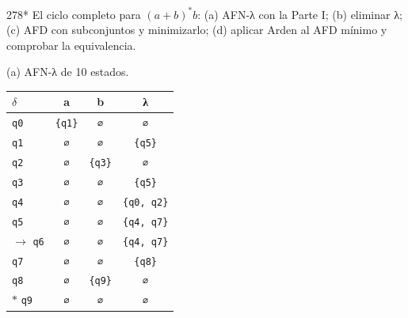 \documentclass[11pt]{article}
\begin{document}
\begin{ejercicio}{278}{*}
El ciclo completo para $(a + b)^*b$: (a) AFN-λ con la Parte I; (b) eliminar λ; (c) AFD con subconjuntos y minimizarlo; (d) aplicar Arden al AFD mínimo y comprobar la equivalencia.
\end{ejercicio}
\proc (a) AFN-λ de 10 estados.\begin{center}\small\begin{tabular}{lccc}\toprule
$\delta$ & a & b & λ \\\midrule
 \texttt{q0} & \texttt{\{q1\}} & \texttt{∅} & \texttt{∅} \\
 \texttt{q1} & \texttt{∅} & \texttt{∅} & \texttt{\{q5\}} \\
 \texttt{q2} & \texttt{∅} & \texttt{\{q3\}} & \texttt{∅} \\
 \texttt{q3} & \texttt{∅} & \texttt{∅} & \texttt{\{q5\}} \\
 \texttt{q4} & \texttt{∅} & \texttt{∅} & \texttt{\{q0, q2\}} \\
 \texttt{q5} & \texttt{∅} & \texttt{∅} & \texttt{\{q4, q7\}} \\
$\to$ \texttt{q6} & \texttt{∅} & \texttt{∅} & \texttt{\{q4, q7\}} \\
 \texttt{q7} & \texttt{∅} & \texttt{∅} & \texttt{\{q8\}} \\
 \texttt{q8} & \texttt{∅} & \texttt{\{q9\}} & \texttt{∅} \\
$*$ \texttt{q9} & \texttt{∅} & \texttt{∅} & \texttt{∅} \\
\bottomrule\end{tabular}\end{center}
\end{document}
